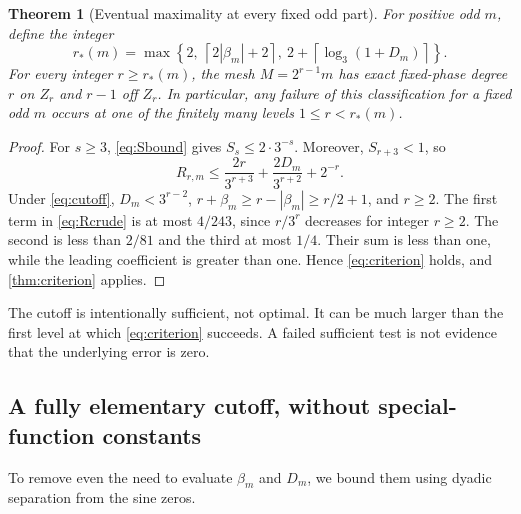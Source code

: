 \documentclass[11pt,a4paper]{article}
\numberwithin{equation}{section}
\theoremstyle{plain}
\newtheorem{theorem}{Theorem}[section]
\theoremstyle{definition}
\theoremstyle{remark}
\begin{document}
\begin{theorem}[Eventual maximality at every fixed odd part]
\label{thm:eventual}
For positive odd $m$, define the integer
\begin{equation}\label{eq:cutoff}
 r_*(m)=\max\left\{2,\ \left\lceil2|\beta_m|+2\right\rceil,
 \ 2+\left\lceil\log_3(1+D_m)\right\rceil\right\}.
\end{equation}
For every integer $r\ge r_*(m)$, the mesh $M=2^{r-1}m$ has exact
fixed-phase degree $r$ on $Z_r$ and $r-1$ off $Z_r$. In particular, any
failure of this classification for a fixed odd $m$ occurs at one of the
finitely many levels $1\le r<r_*(m)$.
\end{theorem}
\begin{proof}
For $s\ge3$, \eqref{eq:Sbound} gives $S_s\le2\cdot3^{-s}$.
Moreover, $S_{r+3}<1$, so
\begin{equation}\label{eq:Rcrude}
 R_{r,m}\le\frac{2r}{3^{r+3}}+
                \frac{2D_m}{3^{r+2}}+2^{-r}.
\end{equation}
Under \eqref{eq:cutoff}, $D_m<3^{r-2}$,
$r+\beta_m\ge r-|\beta_m|\ge r/2+1$, and $r\ge2$.
The first term in \eqref{eq:Rcrude} is at most $4/243$, since
$r/3^r$ decreases for integer $r\ge2$. The second is less than $2/81$
and the third at most $1/4$. Their sum is less than one, while the
leading coefficient is greater than one. Hence \eqref{eq:criterion}
holds, and \cref{thm:criterion} applies.
\end{proof}

The cutoff is intentionally sufficient, not optimal. It can be much larger
than the first level at which \eqref{eq:criterion} succeeds. A failed
sufficient test is not evidence that the underlying error is zero.

\subsection{A fully elementary cutoff, without special-function constants}

To remove even the need to evaluate $\beta_m$ and $D_m$, we bound them
using dyadic separation from the sine zeros.
\end{document}
